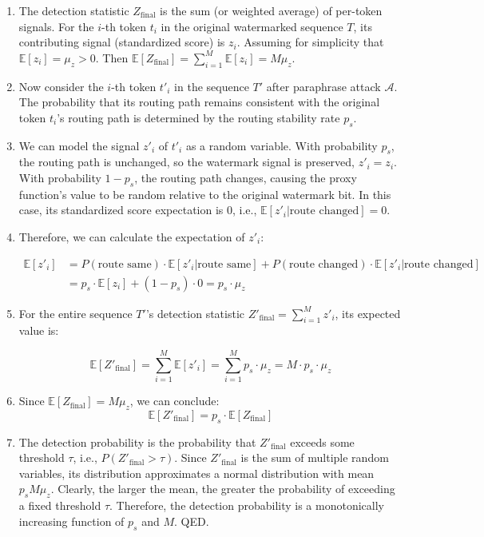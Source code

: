 \documentclass[letterpaper,twocolumn,10pt]{article}
\begin{document}
\begin{enumerate}
\item The detection statistic $Z_{\text{final}}$ is the sum (or weighted average) of per-token signals. For the $i$-th token $t_i$ in the original watermarked sequence $T$, its contributing signal (standardized score) is $z_i$. Assuming for simplicity that $\mathbb{E}[z_i] = \mu_z > 0$. Then $\mathbb{E}[Z_{\text{final}}] = \sum_{i=1}^M \mathbb{E}[z_i] = M \mu_z$.

\item Now consider the $i$-th token $t'_i$ in the sequence $T'$ after paraphrase attack $\mathcal{A}$. The probability that its routing path remains consistent with the original token $t_i$'s routing path is determined by the routing stability rate $p_s$.

\item We can model the signal $z'_i$ of $t'_i$ as a random variable. With probability $p_s$, the routing path is unchanged, so the watermark signal is preserved, $z'_i = z_i$. With probability $1-p_s$, the routing path changes, causing the proxy function's value to be random relative to the original watermark bit. In this case, its standardized score expectation is 0, i.e., $\mathbb{E}[z'_i | \text{route changed}] = 0$.

\item Therefore, we can calculate the expectation of $z'_i$:

\begin{align}
\mathbb{E}[z'_i] &= P(\text{route same}) \cdot \mathbb{E}[z'_i | \text{route same}] + P(\text{route changed}) \cdot \mathbb{E}[z'_i | \text{route changed}] \\
&= p_s \cdot \mathbb{E}[z_i] + (1-p_s) \cdot 0 = p_s \cdot \mu_z
\end{align}

\item For the entire sequence $T'$'s detection statistic $Z'_{\text{final}} = \sum_{i=1}^M z'_i$, its expected value is:

\begin{equation}
\mathbb{E}[Z'_{\text{final}}] = \sum_{i=1}^M \mathbb{E}[z'_i] = \sum_{i=1}^M p_s \cdot \mu_z = M \cdot p_s \cdot \mu_z
\end{equation}

\item Since $\mathbb{E}[Z_{\text{final}}] = M \mu_z$, we can conclude:
\begin{equation}
\mathbb{E}[Z'_{\text{final}}] = p_s \cdot \mathbb{E}[Z_{\text{final}}]
\end{equation}

\item The detection probability is the probability that $Z'_{\text{final}}$ exceeds some threshold $\tau$, i.e., $P(Z'_{\text{final}} > \tau)$. Since $Z'_{\text{final}}$ is the sum of multiple random variables, its distribution approximates a normal distribution with mean $p_s M \mu_z$. Clearly, the larger the mean, the greater the probability of exceeding a fixed threshold $\tau$. Therefore, the detection probability is a monotonically increasing function of $p_s$ and $M$. QED.
\end{enumerate}




\end{document}
